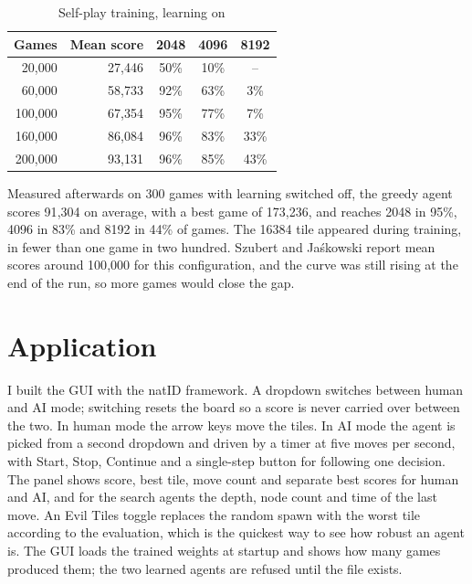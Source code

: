 \documentclass[conference]{IEEEtran}
\begin{document}
\begin{table}[htbp]
\caption{Self-play training, learning on}
\begin{center}
\begin{tabular}{|r|r|c|c|c|}
\hline
\textbf{Games} & \textbf{Mean score} & \textbf{2048} & \textbf{4096} & \textbf{8192} \\
\hline
20{,}000  & 27{,}446 & 50\% & 10\% & -- \\
\hline
60{,}000  & 58{,}733 & 92\% & 63\% & 3\% \\
\hline
100{,}000 & 67{,}354 & 95\% & 77\% & 7\% \\
\hline
160{,}000 & 86{,}084 & 96\% & 83\% & 33\% \\
\hline
200{,}000 & 93{,}131 & 96\% & 85\% & 43\% \\
\hline
\end{tabular}
\label{tab:train}
\end{center}
\end{table}

Measured afterwards on 300 games with learning switched off, the greedy agent scores 91{,}304 on average, with a best game of 173{,}236, and reaches 2048 in 95\%, 4096 in 83\% and 8192 in 44\% of games. The 16384 tile appeared during training, in fewer than one game in two hundred. Szubert and Jaśkowski report mean scores around 100{,}000 for this configuration, and the curve was still rising at the end of the run, so more games would close the gap.

\section{Application}
I built the GUI with the natID framework. A dropdown switches between human and AI mode; switching resets the board so a score is never carried over between the two. In human mode the arrow keys move the tiles. In AI mode the agent is picked from a second dropdown and driven by a timer at five moves per second, with Start, Stop, Continue and a single-step button for following one decision. The panel shows score, best tile, move count and separate best scores for human and AI, and for the search agents the depth, node count and time of the last move. An Evil Tiles toggle replaces the random spawn with the worst tile according to the evaluation, which is the quickest way to see how robust an agent is. The GUI loads the trained weights at startup and shows how many games produced them; the two learned agents are refused until the file exists.
\end{document}
